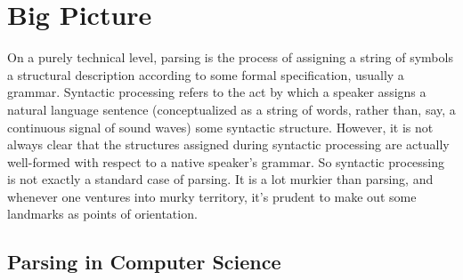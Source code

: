 \chapter{Big Picture}
\label{cha:BigPicture}

On a purely technical level, parsing is the process of assigning a string of symbols a structural description according to some formal specification, usually a grammar.
Syntactic processing refers to the act by which a speaker assigns a natural language sentence (conceptualized as a string of words, rather than, say, a continuous signal of sound waves) some syntactic structure. 
However, it is not always clear that the structures assigned during syntactic processing are actually well-formed with respect to a native speaker's grammar.
So syntactic processing is not exactly a standard case of parsing.
It is a lot murkier than parsing, and whenever one ventures into murky territory, it's prudent to make out some landmarks as points of orientation.

\section{Parsing in Computer Science}
\label{sec:BigPicture_CS}
